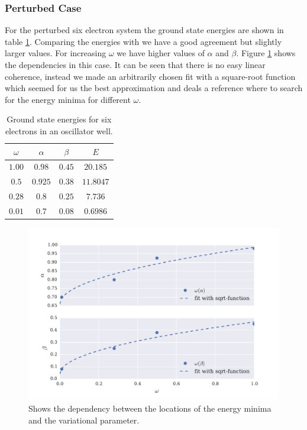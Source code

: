 \subsubsection{Perturbed Case}\label{sec:perturbed_six}
For the perturbed six electron system the ground state energies are shown in table \ref{tab:groundstate_sixelectron}. Comparing the energies with \citet[TABLE III]{lohne2011} we have a good agreement but slightly larger values. For increasing $\omega$ we have higher values of $\alpha$ and $\beta$. Figure \ref{fig:alpha_beta_omega} shows the dependencies in this case. It can be seen that there is no easy linear coherence, instead we made an arbitrarily chosen fit with a square-root function which seemed for us the best approximation and deals a reference where to search for the energy minima for different $\omega$. 
\begin{table}
    \centering
    \caption{Ground state energies for six electrons in an oscillator well.}
    \begin{tabular}{c|cc|c}
    $\omega$   & $\alpha$    & $\beta$ &    $E$    \\ \hline
    $1.00$     & $0.98$      & $0.45$  & $20.185$  \\
    $0.5$      & $0.925$	    & $0.38$  & $11.8047$ \\
    $0.28$     & $0.8$       & $0.25$  & $7.736$   \\
    $0.01$     & $0.7$       & $0.08$  & $0.6986$  \\
    \end{tabular}
    \label{tab:groundstate_sixelectron}
\end{table}
\begin{figure}[htbp]
    \centering
    \includegraphics[scale=0.7]{alpha_beta_omega.pdf}
    \caption{Shows the dependency between the locations of the energy minima and the variational parameter.}
    \label{fig:alpha_beta_omega}
\end{figure}

